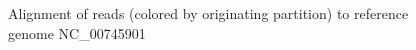 \documentclass[11pt]{article} %
\begin{document}
\begin{figure}[h!]
\caption{Alignment of reads (colored by originating partition) to reference genome NC\_00745901}
\label{partitionreference}
\end{figure}
\end{document}
